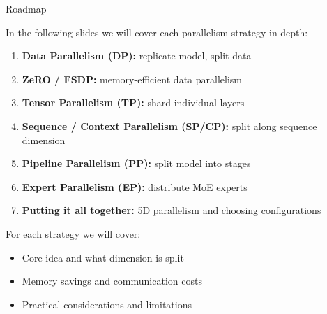 \begin{frame}{Roadmap}

  In the following slides we will cover each parallelism strategy in depth:

  \vspace{0.5em}
  \begin{enumerate}
    \item \textbf{Data Parallelism (DP):} replicate model, split data
    \item \textbf{ZeRO / FSDP:} memory-efficient data parallelism
    \item \textbf{Tensor Parallelism (TP):} shard individual layers
    \item \textbf{Sequence / Context Parallelism (SP/CP):} split along sequence dimension
    \item \textbf{Pipeline Parallelism (PP):} split model into stages
    \item \textbf{Expert Parallelism (EP):} distribute MoE experts
    \item \textbf{Putting it all together:} 5D parallelism and choosing configurations
  \end{enumerate}

  \vspace{0.5em}
  For each strategy we will cover:
  \begin{itemize}
    \item Core idea and what dimension is split
    \item Memory savings and communication costs
    \item Practical considerations and limitations
  \end{itemize}
\end{frame}
